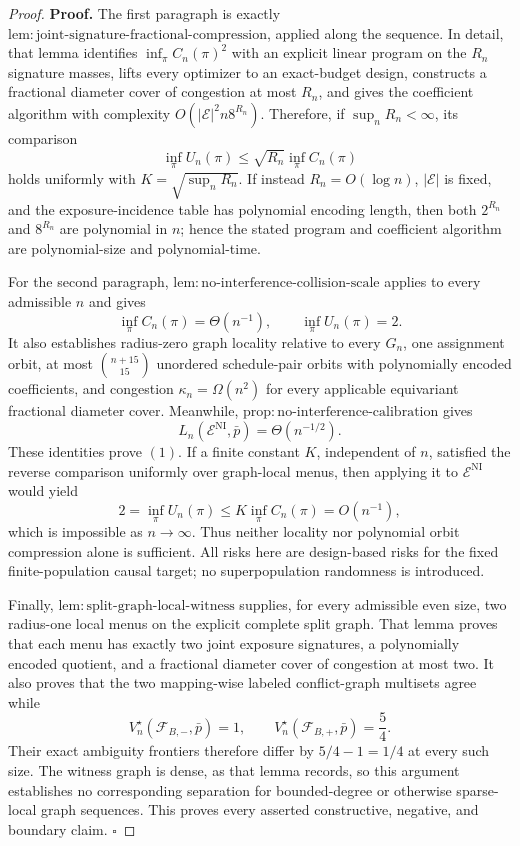 \documentclass{article}
\begin{document}
\begin{proof}
\textbf{Proof.}
The first paragraph is exactly \(\mathrm{lem{:}joint\text{-}signature\text{-}fractional\text{-}compression}\), applied along the sequence. In detail, that lemma identifies \(\inf_\pi C_n(\pi)^2\) with an explicit linear program on the \(R_n\) signature masses, lifts every optimizer to an exact-budget design, constructs a fractional diameter cover of congestion at most \(R_n\), and gives the coefficient algorithm with complexity \(O(|\mathcal E|^2n8^{R_n})\). Therefore, if \(\sup_n R_n<\infty\), its comparison
\[
 \inf_\pi U_n(\pi)
 \le \sqrt{R_n}\inf_\pi C_n(\pi)
\]
holds uniformly with \(K=\sqrt{\sup_nR_n}\). If instead \(R_n=O(\log n)\), \(|\mathcal E|\) is fixed, and the exposure-incidence table has polynomial encoding length, then both \(2^{R_n}\) and \(8^{R_n}\) are polynomial in \(n\); hence the stated program and coefficient algorithm are polynomial-size and polynomial-time.

For the second paragraph, \(\mathrm{lem{:}no\text{-}interference\text{-}collision\text{-}scale}\) applies to every admissible \(n\) and gives
\[
 \inf_\pi C_n(\pi)=\Theta(n^{-1}),
 \qquad
 \inf_\pi U_n(\pi)=2.
\]
It also establishes radius-zero graph locality relative to every \(G_n\), one assignment orbit, at most \(\binom{n+15}{15}\) unordered schedule-pair orbits with polynomially encoded coefficients, and congestion \(\kappa_n=\Omega(n^2)\) for every applicable equivariant fractional diameter cover. Meanwhile, \(\mathrm{prop{:}no\text{-}interference\text{-}calibration}\) gives
\[
 L_n(\mathcal E^{\mathrm{NI}},\bar p)=\Theta(n^{-1/2}).
\]
These identities prove \((1)\). If a finite constant \(K\), independent of \(n\), satisfied the reverse comparison uniformly over graph-local menus, then applying it to \(\mathcal E^{\mathrm{NI}}\) would yield
\[
 2=\inf_\pi U_n(\pi)
 \le K\inf_\pi C_n(\pi)
 =O(n^{-1}),
\]
which is impossible as \(n\to\infty\). Thus neither locality nor polynomial orbit compression alone is sufficient. All risks here are design-based risks for the fixed finite-population causal target; no superpopulation randomness is introduced.

Finally, \(\mathrm{lem{:}split\text{-}graph\text{-}local\text{-}witness}\) supplies, for every admissible even size, two radius-one local menus on the explicit complete split graph. That lemma proves that each menu has exactly two joint exposure signatures, a polynomially encoded quotient, and a fractional diameter cover of congestion at most two. It also proves that the two mapping-wise labeled conflict-graph multisets agree while
\[
 V_n^\star(\mathcal F_{B,-},\bar p)=1,
 \qquad
 V_n^\star(\mathcal F_{B,+},\bar p)=\frac54.
\]
Their exact ambiguity frontiers therefore differ by \(5/4-1=1/4\) at every such size. The witness graph is dense, as that lemma records, so this argument establishes no corresponding separation for bounded-degree or otherwise sparse-local graph sequences. This proves every asserted constructive, negative, and boundary claim. \(\square\)
\end{proof}
\end{document}
